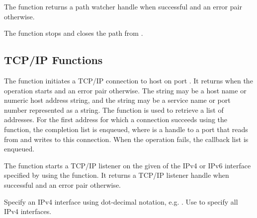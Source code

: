 The  function returns a path watcher handle
when successful and an error pair otherwise.

\begin{function}
\end{function}

The  function stops and closes the
path  from .

\subsection {TCP/IP Functions}

\begin{function}
\end{function}

The  function initiates a TCP/IP connection to
host  on port . It returns  when the
operation starts and an error pair otherwise. The  string
may be a host name or numeric host address string, and the
 string may be a service name or port number represented
as a string. The  function is used to retrieve a
list of addresses. For the first address for which a connection
succeeds using the  function, the completion
list  is enqueued, where 
is a handle to a port that reads from and writes to this
connection. When the operation fails, the callback list
 is enqueued.

\begin{function}
\end{function}

The  function starts a TCP/IP listener on the
given  of the IPv4 or IPv6 interface specified by
 using the  function. It returns a
TCP/IP listener handle when successful and an error pair otherwise.

Specify an IPv4 interface  using dot-decimal notation,
e.g. . Use  to specify all IPv4
interfaces.

